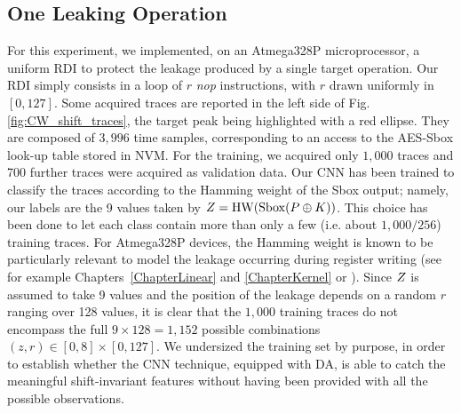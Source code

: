 \subsection{One Leaking Operation}\label{sec:soft}
For this experiment, we implemented, on an Atmega328P microprocessor, a uniform RDI \cite{tunstall2007efficient} to protect the leakage produced by a single target operation. Our RDI simply consists in a loop of  $r$ \emph{nop} instructions, with $r$  drawn uniformly in $[0,127]$. Some acquired traces are reported in the left side of Fig. \ref{fig:CW_shift_traces}, the target peak being highlighted with a red ellipse. They are composed of $3,996$ time samples, corresponding to an access to the AES-Sbox look-up table stored in NVM. For the training, we acquired only $1,000$ traces and 700 further traces were acquired as validation data. Our CNN has been trained to classify the traces according to the Hamming weight of the Sbox output; namely, our labels are the 9 values taken by $Z = \mathrm{HW}(\mathrm{Sbox}(P\oplus K))$. This choice has been done to let each class contain more than only a few (i.e. about $1,000/256$) training traces.
For Atmega328P devices, the Hamming weight is known to be particularly relevant to model the leakage occurring during register writing (see for example Chapters~\ref{ChapterLinear} and \ref{ChapterKernel} or \cite{BelaidCFGKP15}). Since $Z$ is assumed to take 9 values and the position of the leakage depends on a random $r$ ranging over 128 values, it is clear that the $1,000$ training traces do not encompass the full $9 \times 128=1,152$ possible combinations $(z,r)\in [0,8]\times[0,127]$. We undersized the training set by purpose, in order to establish whether the CNN technique, equipped with DA, is able to catch the meaningful shift-invariant features without having been provided with all the possible observations.\\


